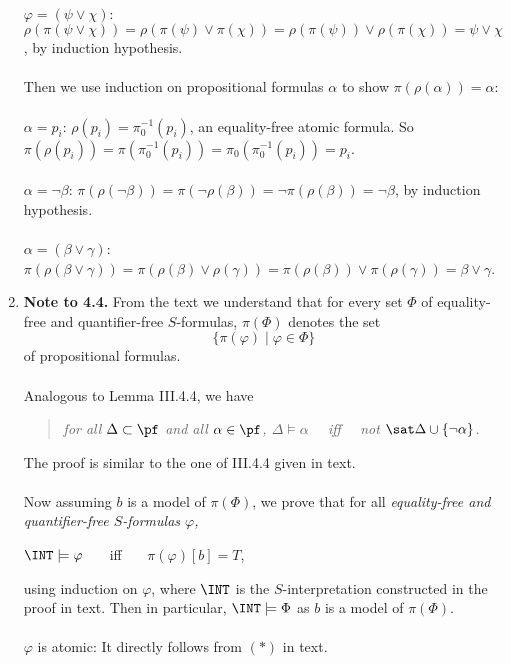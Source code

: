 \begin{enumerate}[1.]
\ \\
$\varphi = (\psi \lor \chi)$: $\rho ( \pi ( \psi \lor \chi ) ) = \rho ( \pi ( \psi ) \lor \pi ( \chi ) ) = \rho ( \pi ( \psi ) ) \lor \rho ( \pi ( \chi ) ) = \psi \lor \chi$, by induction hypothesis.\\
\ \\
Then we use induction on propositional formulas $\alpha$ to show $\pi ( \rho ( \alpha ) ) = \alpha$:\\
\ \\
$\alpha = p_i$: $\rho ( p_i ) = \pi_0^{-1} ( p_i )$, an equality-free atomic formula. So $\pi ( \rho ( p_i ) ) = \pi ( \pi_0^{-1} ( p_i ) ) = \pi_0 ( \pi_0^{-1} ( p_i ) ) = p_i$.\\
\ \\
$\alpha = \neg\beta$: $\pi ( \rho ( \neg\beta ) ) = \pi ( \neg\rho ( \beta ) ) = \neg\pi ( \rho ( \beta ) ) = \neg\beta$, by induction hypothesis.\\
\ \\
$\alpha = (\beta \lor \gamma)$: $\pi ( \rho ( \beta \lor \gamma ) ) = \pi ( \rho ( \beta ) \lor \rho ( \gamma ) ) = \pi ( \rho ( \beta ) ) \lor \pi ( \rho ( \gamma ) ) = \beta \lor \gamma$.
%
\item \textbf{Note to 4.4.} From the text we understand that for every set $\Phi$ of equality-free and quantifier-free $S$-formulas, $\pi (\Phi)$ denotes the set
\[
\{ \pi ( \varphi ) \mid \varphi \in \Phi \}
\]
of propositional formulas.\\
\ \\
Analogous to Lemma III.4.4, we have 
\begin{quote}
\emph{for all $\Delta \subset \pf$ and all $\alpha \in \pf$, $\Delta \models \alpha$ \ \ iff \ \ not $\sat \Delta \cup \{ \neg\alpha \}$.}
\end{quote}
The proof is similar to the one of III.4.4 given in text.\\
\ \\
Now assuming $b$ is a model of $\pi (\Phi)$, we prove that for all \emph{equality-free and quantifier-free $S$-formulas $\varphi$,}
\begin{center}
$\INT \models \varphi$ \ \ \ iff \ \ \ $\pi ( \varphi ) [b] = T$,
\end{center}
using induction on $\varphi$, where $\INT$ is the $S$-interpretation constructed in the proof in text. Then in particular, $\INT \models \Phi$ as $b$ is a model of $\pi (\Phi)$.\\
\ \\
$\varphi$ is atomic: It directly follows from $(*)$ in text.\\

\end{enumerate}
